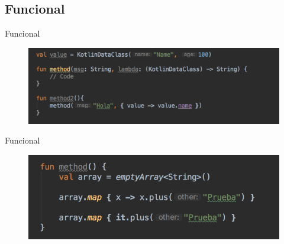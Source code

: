 \subsection{Funcional}
\begin{frame}{Funcional}{}
    \begin{figure}[h]
    \centering
    \includegraphics[width=\textwidth]{images/kotlin_vs_java/functional_1}
    \end{figure}
\end{frame}

\begin{frame}{Funcional}{}
    \begin{figure}[h]
    \centering
    \includegraphics[width=\textwidth]{images/kotlin_vs_java/functional_2}
    \end{figure}
\end{frame}
